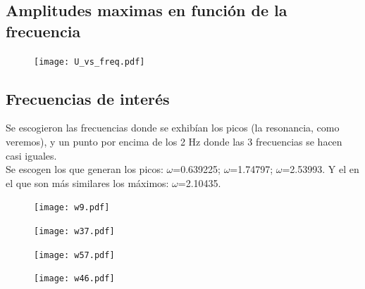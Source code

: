 \documentclass[11pt,letterpaper]{exam}
\begin{document}
\subsection{Amplitudes maximas en función de la frecuencia}
\begin{figure}[H]
\centering
\texttt{[image: U\_vs\_freq.pdf]}
\end{figure}

\subsection{Frecuencias de interés}
Se escogieron las frecuencias donde se exhibían los picos (la resonancia, como veremos), y un punto por encima de los 2 Hz donde las 3 frecuencias se hacen casi iguales.\\
Se escogen los que generan los picos: $\omega$=0.639225; $\omega$=1.74797;  $\omega$=2.53993. Y el en el que son más similares los máximos: $\omega$=2.10435.
\begin{figure}[H]
\centering
\texttt{[image: w9.pdf]}
\end{figure}

\begin{figure}[H]
\centering
\texttt{[image: w37.pdf]}
\end{figure}

\begin{figure}[H]
\centering
\texttt{[image: w57.pdf]}
\end{figure}

\begin{figure}[H]
\centering
\texttt{[image: w46.pdf]}
\end{figure}
\end{document}

